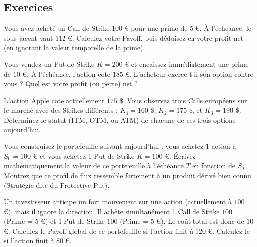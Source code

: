 \subsection{Exercices}

\begin{exercicebox}
Vous avez acheté un Call de Strike $100$ € pour une prime de $5$ €. À l'échéance, le sous-jacent vaut $112$ €. 
Calculez votre Payoff, puis déduisez-en votre profit net (en ignorant la valeur temporelle de la prime).
\end{exercicebox}

\begin{exercicebox}
Vous vendez un Put de Strike $K = 200$ € et encaissez immédiatement une prime de $10$ €. À l'échéance, l'action cote $185$ €. 
L'acheteur exerce-t-il son option contre vous ? Quel est votre profit (ou perte) net ?
\end{exercicebox}

\begin{exercicebox}
L'action Apple cote actuellement $175$ \$. Vous observez trois Calls européens sur le marché avec des Strikes différents : $K_1 = 160$ \$, $K_2 = 175$ \$, et $K_3 = 190$ \$. 
Déterminez le statut (ITM, OTM, ou ATM) de chacune de ces trois options aujourd'hui.
\end{exercicebox}

\begin{exercicebox}
Vous construisez le portefeuille suivant aujourd'hui : vous achetez 1 action à $S_0 = 100$ € et vous achetez 1 Put de Strike $K = 100$ €.
Écrivez mathématiquement la valeur de ce portefeuille à l'échéance $T$ en fonction de $S_T$. Montrez que ce profil de flux ressemble fortement à un produit dérivé bien connu (Stratégie dite du Protective Put).
\end{exercicebox}

\begin{exercicebox}
Un investisseur anticipe un fort mouvement sur une action (actuellement à $100$ €), mais il ignore la direction. Il achète simultanément 1 Call de Strike $100$ (Prime = 5 €) et 1 Put de Strike $100$ (Prime = 5 €). Le coût total est donc de $10$ €.
Calculez le Payoff global de ce portefeuille si l'action finit à $120$ €. Calculez-le si l'action finit à $80$ €.
\end{exercicebox}
